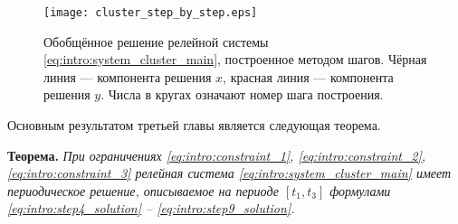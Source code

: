 \begin{figure}[!ht]
	\centering
	\texttt{[image: cluster\_step\_by\_step.eps]}
	\caption{Обобщённое решение релейной системы \eqref{eq:intro:system_cluster_main}, построенное методом шагов. Чёрная линия --- компонента решения $x$, красная линия --- компонента решения $y$. Числа в кругах означают номер шага построения.}
	\label{fig:intro:cluster_step_by_step}
\end{figure}

Основным результатом третьей главы является следующая теорема.

\textbf{Теорема.} \textit{При ограничениях \eqref{eq:intro:constraint_1}, \eqref{eq:intro:constraint_2}, \eqref{eq:intro:constraint_3} релейная система \eqref{eq:intro:system_cluster_main} имеет периодическое решение, описываемое на периоде $[t_1, t_3]$ формулами \eqref{eq:intro:step4_solution} -- \eqref{eq:intro:step9_solution}.}



